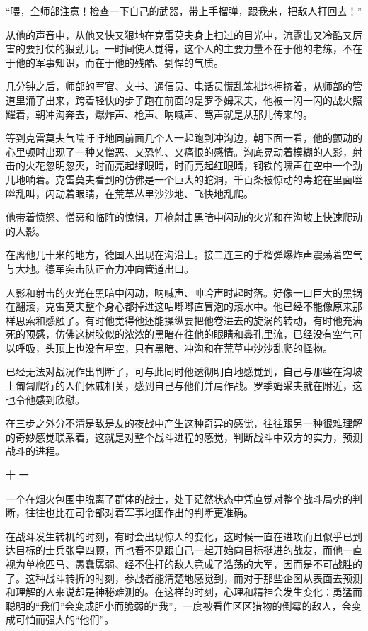 “喂，全师部注意！检查一下自己的武器，带上手榴弹，跟我来，把敌人打回去！”

从他的声音中，从他又快又狠地在克雷莫夫身上扫过的目光中，流露出又冷酷又厉害的要打仗的狠劲儿。一时间使人觉得，这个人的主要力量不在于他的老练，不在于他的军事知识，而在于他的残酷、剽悍的气质。

几分钟之后，师部的军官、文书、通信员、电话员慌乱笨拙地拥挤着，从师部的管道里涌了出来，跨着轻快的步子跑在前面的是罗季姆采夫，他被一闪一闪的战火照耀着，朝冲沟奔去，爆炸声、枪声、呐喊声、骂声就是从那儿传来的。

等到克雷莫夫气喘吁吁地同前面几个人一起跑到冲沟边，朝下面一看，他的颤动的心里顿时出现了一种又憎恶、又恐怖、又痛恨的感情。沟底晃动着模糊的人影，射击的火花忽明忽灭，时而亮起绿眼睛，时而亮起红眼睛，钢铁的啸声在空中一个劲儿地响着。克雷莫夫看到的仿佛是一个巨大的蛇洞，千百条被惊动的毒蛇在里面咝咝乱叫，闪动着眼睛，在荒草丛里沙沙地、飞快地乱爬。

他带着愤怒、憎恶和临阵的惊惧，开枪射击黑暗中闪动的火光和在沟坡上快速爬动的人影。

在离他几十米的地方，德国人出现在沟沿上。接二连三的手榴弹爆炸声震荡着空气与大地。德军突击队正奋力冲向管道出口。

人影和射击的火光在黑暗中闪动，呐喊声、呻吟声时起时落。好像一口巨大的黑锅在翻滚，克雷莫夫整个身心都掉进这咕嘟嘟直冒泡的滚水中。他已经不能像原来那样思索和感触了。有时他觉得他还能操纵要把他卷进去的旋涡的转动，有时他充满死的预感，仿佛这树胶似的浓浓的黑暗在往他的眼睛和鼻孔里流，已经没有空气可以呼吸，头顶上也没有星空，只有黑暗、冲沟和在荒草中沙沙乱爬的怪物。

已经无法对战况作出判断了，可与此同时他透彻明白地感觉到，自己与那些在沟坡上匍匐爬行的人们休戚相关，感到自己与他们并肩作战。罗季姆采夫就在附近，这也令他感到欣慰。

在三步之外分不清是敌是友的夜战中产生这种奇异的感觉，往往跟另一种很难理解的奇妙感觉联系着，这就是对整个战斗进程的感觉，判断战斗中双方的实力，预测战斗的进程。

十 一

一个在烟火包围中脱离了群体的战士，处于茫然状态中凭直觉对整个战斗局势的判断，往往也比在司令部对着军事地图作出的判断更准确。

在战斗发生转机的时刻，有时会出现惊人的变化，这时候一直在进攻而且似乎已到达目标的士兵张皇四顾，再也看不见跟自己一起开始向目标挺进的战友，而他一直视为单枪匹马、愚蠢孱弱、经不住打的敌人竟成了浩荡的大军，因而是不可战胜的了。这种战斗转折的时刻，参战者能清楚地感觉到，而对于那些企图从表面去预测和理解的人来说却是神秘难测的。在这样的时刻，心理和精神会发生变化：勇猛而聪明的“我们”会变成胆小而脆弱的“我”，一度被看作区区猎物的倒霉的敌人，会变成可怕而强大的“他们”。

